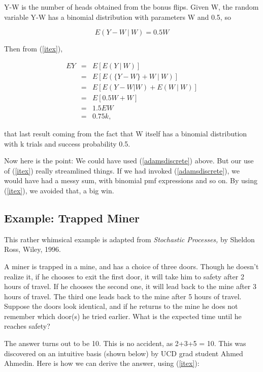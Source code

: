 \documentclass[11pt]{article}
\begin{document}
Y-W is the number of heads obtained from the bonus flips.  Given W, the
random variable Y-W has a binomial distribution with parameters W and
0.5, so 

\begin{equation}
E(Y-W ~|~ W) = 0.5 W
\end{equation}

Then from (\ref{itex}),

\begin{eqnarray}
EY &=& E[E(Y ~|~ W)] \\ 
&=& E \left [E ( \{ Y-W \} + W ~|~ W ) \right ] \\
&=& E \left [E (Y-W | W) + E(W ~|~ W ) \right ] \\
&=& E \left [ 0.5W + W \right ] \\
&=& 1.5 EW \\
&=& 0.75 k,
\end{eqnarray}

that last result coming from the fact that W itself has a binomial
distribution with k trials and success probability 0.5.

Now here is the point:  We could have used (\ref{adamsdiscrete}) above.
But our use of (\ref{itex}) really streamlined things.  If we had
invoked (\ref{adamsdiscrete}), we would have had a messy sum, with
binomial pmf expressions and so on.  By using (\ref{itex}), we avoided
that, a big win.

\subsection{Example:  Trapped Miner}
\label{trappedminer}

This rather whimsical example is adapted from \textit{Stochastic
Processes,} by Sheldon Ross, Wiley, 1996.

A miner is trapped in a mine, and has a choice of three doors.  Though
he doesn't realize it, if he chooses to exit the first door, it will
take him to safety after 2 hours of travel.  If he chooses the second
one, it will lead back to the mine after 3 hours of travel. The third
one leads back to the mine after 5 hours of travel. Suppose the doors
look identical, and if he returns to the mine he does not remember which
door(s) he tried earlier. What is the expected time until he reaches
safety?

The answer turns out to be 10.  This is no accident, as 2+3+5 = 10.
This was discovered on an intuitive basis (shown below) by UCD grad
student Ahmed Ahmedin.  Here is how we can derive the answer, using
(\ref{itex}):
\end{document}
